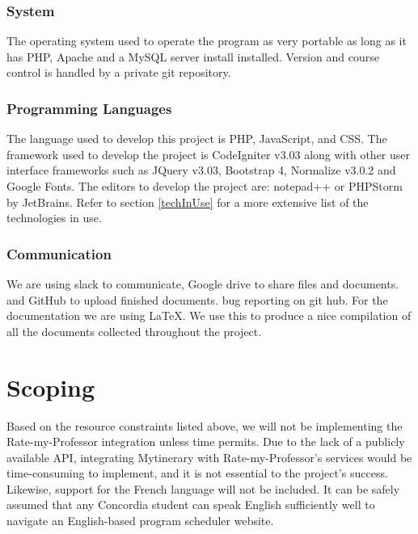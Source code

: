 \documentclass[12pt]{article}
\begin{document}
\subsubsection{System}

The operating system used to operate the program as very portable as long as it has PHP, Apache and a MySQL server install installed.  Version and course control is handled by a private git repository. 

\subsubsection{Programming Languages}
The language used to develop this project is PHP, JavaScript, and CSS. The framework used to develop the project is CodeIgniter v3.03 along with other user interface frameworks such as JQuery v3.03, Bootstrap  4, Normalize v3.0.2  and Google Fonts. The editors to develop the project are: notepad++ or PHPStorm by JetBrains. Refer to section \ref{techInUse} for a more extensive list of the technologies in use.

\subsubsection{Communication}

We are using slack to communicate, Google drive to share files and documents. and GitHub to upload finished documents. bug reporting on git hub. For the documentation we are using LaTeX. We use this to produce a nice compilation of all the documents collected throughout the project.  

\vfill
\newpage
\section{Scoping}
Based on the resource constraints listed above, we will not be implementing the Rate-my-Professor integration unless time permits. Due to the lack of a publicly available API, integrating Mytinerary with Rate-my-Professor's services would be time-consuming to implement, and it is not essential to the project's success. Likewise, support for the French language will not be included. It can be safely assumed that any Concordia student can speak English sufficiently well to navigate an English-based program scheduler website.

\vfill
\newpage
\end{document}
